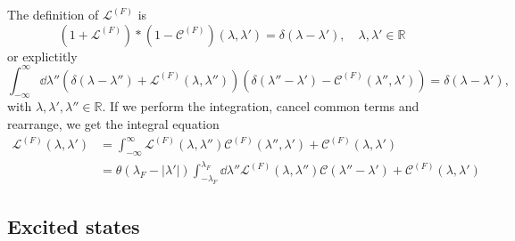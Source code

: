 \documentclass[11pt, a4paper]{report} %
\newcommand{\inversetruncc}{\mathcal{L}}
\newcommand{\kernel}{\mathcal{C}}
\begin{document}
The definition of \(\inversetruncc^{(F)}\) is \cite{tofind}
\begin{equation}
	\left(1 + \inversetruncc^{(F)}\right) * \left(1 - \kernel^{(F)}\right)(\lambda,\lambda')=\delta(\lambda-\lambda'), \quad \lambda, \lambda' \in \mathbb{R}
\end{equation}
or explictitly
\begin{equation}
	\int_{-\infty}^{\infty} \dd \lambda'' \left( \delta(\lambda-\lambda'') + \inversetruncc^{(F)}(\lambda,\lambda'')\right)\left(\delta(\lambda''-\lambda') - \kernel^{(F)}(\lambda'',\lambda')\right) = \delta(\lambda-\lambda'),
\end{equation}
with  \(\lambda, \lambda', \lambda'' \in \mathbb{R}\).
If we perform the integration, cancel common terms and rearrange, we get the integral equation
\begin{align}
	\inversetruncc^{(F)}(\lambda,\lambda') &= \int_{-\infty}^{\infty} \inversetruncc^{(F)}(\lambda,\lambda'') \kernel^{(F)}(\lambda'',\lambda') + \kernel^{(F)}(\lambda,\lambda')\\
	&= \theta(\lambda_F - \lvert\lambda'\rvert) \int_{-\lambda_F}^{\lambda_F} \dd \lambda'' \inversetruncc^{(F)}(\lambda,\lambda'') \kernel(\lambda''-\lambda') + \kernel^{(F)}(\lambda,\lambda')
\end{align}

\subsection{Excited states}
\end{document}
